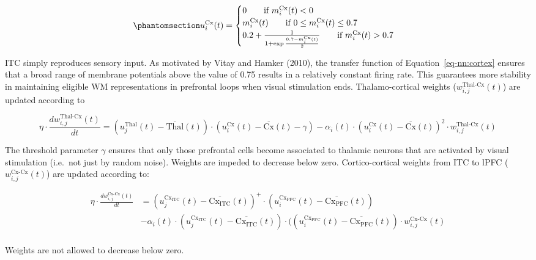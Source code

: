 \documentclass[
  11pt,
  a4paper,
]{scrbook}
\begin{document}
\begin{equation}\phantomsection\label{eq-nn:cortex}{
    u_i^\text{Cx}(t) = \begin{cases} 0 \qquad \text{if } m_i^\text{Cx}(t) < 0 \\
                                    m_i^\text{Cx}(t) \qquad \text{if } 0 \leq m_i^\text{Cx}(t) \leq 0.7 \\
                                    0.2 + \frac{1}{1 + \exp \frac{0.7 - m_i^\text{Cx}(t)}{2} } \qquad \text{if } m_i^\text{Cx}(t) > 0.7
                        \end{cases}
}\end{equation}

ITC simply reproduces sensory input. As motivated by Vitay and Hamker
(2010), the transfer function of Equation~\ref{eq-nn:cortex} ensures
that a broad range of membrane potentials above the value of 0.75
results in a relatively constant firing rate. This guarantees more
stability in maintaining eligible WM representations in prefrontal loops
when visual stimulation ends. Thalamo-cortical weights
(\(w_{i,j}^\text{Thal-Cx}(t)\)) are updated according to

\[
     \eta  \cdot \frac{d w_{i,j}^\text{Thal-Cx}(t)}{dt} = (u_j^\text{Thal}(t) - \overline{\text{Thal}}(t)) \cdot (u_i^\text{Cx}(t) - \overline{\text{Cx}}(t) - \gamma)- \alpha_i(t) \cdot (u_i^\text{Cx}(t) - \overline{\text{Cx}}(t))^2 \cdot w_{i,j}^\text{Thal-Cx}(t)
\]

The threshold parameter \(\gamma\) ensures that only those prefrontal
cells become associated to thalamic neurons that are activated by visual
stimulation (i.e.~not just by random noise). Weights are impeded to
decrease below zero. Cortico-cortical weights from ITC to lPFC
(\(w_{i,j}^\text{Cx-Cx}(t)\)) are updated according to:

\[
\begin{aligned}
  \eta  \cdot \frac{d w_{i,j}^\text{Cx-Cx}(t)}{dt} & = (u_j^{\text{Cx}_\text{ITC}}(t) - \overline{\text{Cx}_\text{ITC}}(t))^+ \cdot  (u_i^{\text{Cx}_\text{PFC}}(t) - \overline{\text{Cx}_\text{PFC}}(t)) \\
        & - \alpha_i(t) \cdot (u_j^{\text{Cx}_\text{ITC}}(t) - \overline{\text{Cx}_\text{ITC}}(t)) \cdot ((u_i^{\text{Cx}_\text{PFC}}(t) - \overline{\text{Cx}_\text{PFC}}(t)) \cdot w_{i,j}^\text{Cx-Cx}(t) \\
\end{aligned}
\]

Weights are not allowed to decrease below zero.
\end{document}
